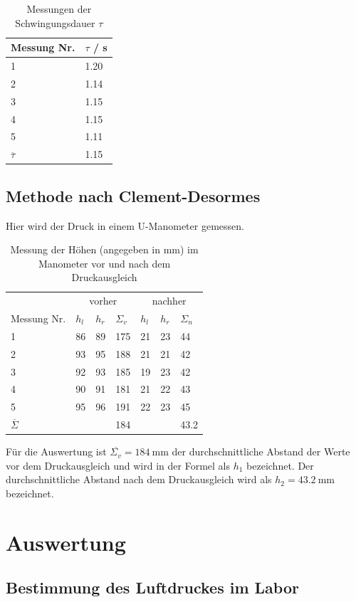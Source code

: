 \documentclass{article}
\begin{document}
\begin{table}[H]
\caption{Messungen der Schwingungsdauer $\tau$}
\begin{tabular}{l|l}
Messung Nr. & $\tau$ / s \\
\hline
1 & 1.20 \\
2 & 1.14 \\
3 & 1.15 \\
4 & 1.15 \\
5 & 1.11 \\
\hline
$\overline{\tau}$ & 1.15
\end{tabular}
\end{table}


\subsection{Methode nach Clement-Desormes}

Hier wird der Druck in einem U-Manometer gemessen.

\begin{table}[H]
\caption{Messung der Höhen (angegeben in mm) im Manometer vor und nach dem Druckausgleich}
\label{tab:clement}
\begin{tabular}{l|lll|lll}
 & \multicolumn{3}{c|}{vorher}&  \multicolumn{3}{c}{nachher}\\
Messung Nr. & $h_l$ & $h_r$ & $\Sigma_v$ & $h_l$ & $h_r$ & $\Sigma_n$ \\
\hline
1 & 86 & 89 & 175 & 21 & 23 & 44 \\
2 & 93 & 95 & 188 & 21 & 21 & 42 \\
3 & 92 & 93 & 185 & 19 & 23 & 42 \\
4 & 90 & 91 & 181 & 21 & 22 & 43 \\
5 & 95 & 96 & 191 & 22 & 23 & 45 \\
\hline
$\overline{\Sigma}$ & & & 184 & & & 43.2
\end{tabular}
\end{table}

Für die Auswertung ist $\overline{\Sigma_v} = 184~$mm der durchschnittliche Abstand der Werte vor dem Druckausgleich und wird in der Formel als $h_1$ bezeichnet. Der durchschnittliche Abstand nach dem Druckausgleich wird als $h_2=43.2~$mm bezeichnet.

\newpage
\section{Auswertung}

\subsection{Bestimmung des Luftdruckes im Labor}
\label{subsec:druck}
\end{document}
